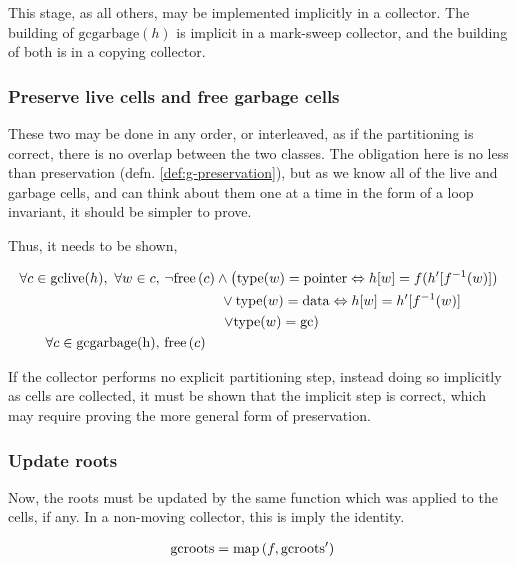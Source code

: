 This stage, as all others, may be implemented implicitly in a
collector. The building of $\mathrm{gcgarbage}(h)$ is implicit in a
mark-sweep collector, and the building of both is in a copying
collector.

\subsubsection{Preserve live cells and free garbage cells}
\label{sec:gc-framework-obligations-collect}

These two may be done in any order, or interleaved, as if the
partitioning is correct, there is no overlap between the two
classes. The obligation here is no less than preservation
(defn. \ref{def:g-preservation}), but as we know all of the live and
garbage cells, and can think about them one at a time in the form of a
loop invariant, it should be simpler to prove.

Thus, it needs to be shown,

\begin{align*}
  \forall c \in \mathrm{gclive}(h),\ \forall w \in c,\ & \lnot\mathrm{free}\left(c\right) \land 
  \left(\mathrm{type}(w) = \mathrm{pointer} \Leftrightarrow h[w] =
    f(h'[f^{-1}(w)])\right.\\
  &\quad\quad\quad\quad \lor \mathrm{type}(w) = \mathrm{data}
  \Leftrightarrow h[w] = h'[f^{-1}(w)]\\
  &\quad\quad\quad\quad \left.\lor \mathrm{type}(w) =
    \mathrm{gc}\right)\\
  \forall c \in \mathrm{gcgarbage(h)},\ & \mathrm{free}\left(c\right)
\end{align*}

If the collector performs no explicit partitioning step, instead doing
so implicitly as cells are collected, it must be shown that the
implicit step is correct, which may require proving the more general
form of preservation.

\subsubsection{Update roots}
\label{sec:gc-framework-obligations-roots}

Now, the roots must be updated by the same function which was applied
to the cells, if any. In a non-moving collector, this is imply the
identity.

\begin{align*}
  \mathrm{gcroots} &= \mathrm{map}\left(f, \mathrm{gcroots'}\right)
\end{align*}

